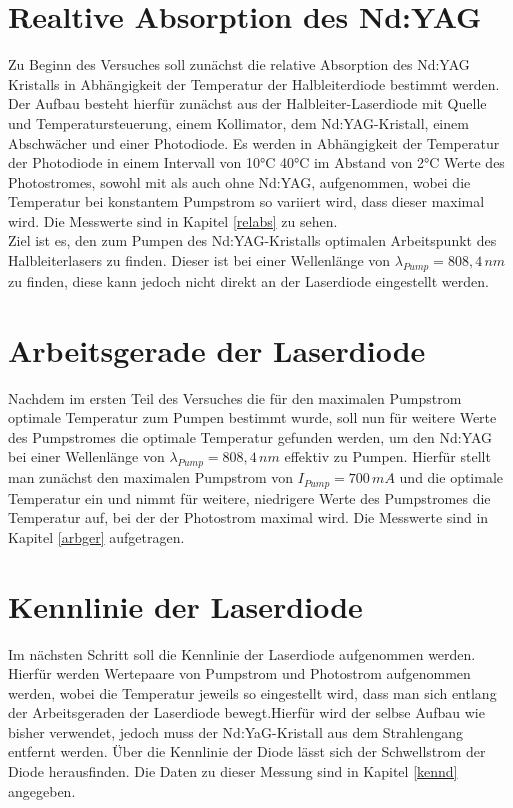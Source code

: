\documentclass[twoside,colorback,accentcolor=tud4c,11pt]{tudreport}
\begin{document}
\section{Realtive Absorption des Nd:YAG}\label{v1}
Zu Beginn des Versuches soll zunächst die relative Absorption des Nd:YAG Kristalls in Abhängigkeit der Temperatur der Halbleiterdiode bestimmt werden. Der Aufbau besteht hierfür zunächst aus der Halbleiter-Laserdiode mit Quelle und Temperatursteuerung, einem Kollimator, dem Nd:YAG-Kristall, einem Abschwächer und einer Photodiode. Es werden in Abhängigkeit der Temperatur der Photodiode in einem Intervall von 10°C 40°C im Abstand von 2°C Werte des Photostromes, sowohl mit als auch ohne Nd:YAG, aufgenommen, wobei die Temperatur bei konstantem Pumpstrom so variiert wird, dass dieser maximal wird. Die Messwerte sind in Kapitel \ref{relabs} zu sehen.\\
Ziel ist es, den zum Pumpen des Nd:YAG-Kristalls optimalen Arbeitspunkt des Halbleiterlasers zu finden. Dieser ist bei einer Wellenlänge von $\lambda_{Pump}=808,4\,\si{nm}$ zu finden, diese kann jedoch nicht direkt an der Laserdiode eingestellt werden.
\section{Arbeitsgerade der Laserdiode}\label{v2}
Nachdem im ersten Teil des Versuches die für den maximalen Pumpstrom optimale Temperatur zum Pumpen bestimmt wurde, soll nun für weitere Werte des Pumpstromes die optimale Temperatur gefunden werden, um den Nd:YAG bei einer Wellenlänge von $\lambda_{Pump}=808,4\,\si{nm}$ effektiv zu Pumpen. Hierfür stellt man zunächst den maximalen Pumpstrom von $I_{Pump}=700\,\si{mA}$ und die optimale Temperatur ein und nimmt für weitere, niedrigere Werte des Pumpstromes die Temperatur auf, bei der der Photostrom maximal wird. Die Messwerte sind in Kapitel \ref{arbger} aufgetragen.
\section{Kennlinie der Laserdiode}\label{v3}
Im nächsten Schritt soll die Kennlinie der Laserdiode aufgenommen werden. Hierfür werden Wertepaare von Pumpstrom und Photostrom aufgenommen werden, wobei die Temperatur jeweils so eingestellt wird, dass man sich entlang der Arbeitsgeraden der Laserdiode bewegt.Hierfür wird der selbse Aufbau wie bisher verwendet, jedoch muss der Nd:YaG-Kristall aus dem Strahlengang entfernt werden. Über die Kennlinie der Diode lässt sich der Schwellstrom der Diode herausfinden. Die Daten zu dieser Messung sind in Kapitel \ref{kennd} angegeben.
\end{document}
